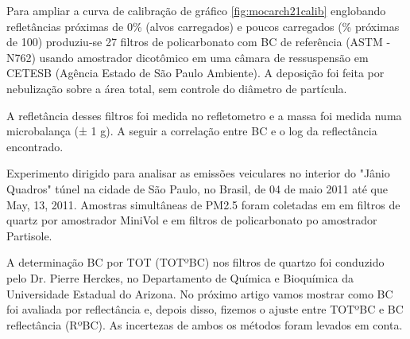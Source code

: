 Para ampliar a curva de calibração de gráfico \ref{fig:mocarch21calib} 
englobando refletâncias próximas de 0\% (alvos carregados) e poucos carregados
(\% próximas de 100) produziu-se 27 filtros de policarbonato com
BC de referência (ASTM -N762) usando amostrador dicotômico em uma câmara de 
ressuspensão em CETESB (Agência Estado de São Paulo Ambiente). 
A deposição foi feita por nebulização sobre a área total, 
sem controle do diâmetro de partícula.

A refletância desses filtros foi medida no refletometro e a massa foi medida 
numa microbalança (± 1 g).
A seguir a correlação entre BC e o log da reflectância encontrado.

%      

Experimento dirigido para analisar as emissões veiculares no interior do 
"Jânio Quadros" túnel na cidade de São Paulo, no Brasil, de 04 de maio 2011 
até que May, 13, 2011. Amostras simultâneas de PM2.5 foram coletadas em 
em filtros de quartz por amostrador MiniVol e em filtros de policarbonato 
po amostrador Partisole. 


A determinação BC por TOT (TOTºBC) nos filtros de quartzo foi conduzido pelo Dr. Pierre Herckes, no Departamento de Química e Bioquímica da Universidade Estadual do Arizona. No próximo artigo vamos mostrar como BC foi avaliada por reflectância e, depois disso, fizemos o ajuste entre TOTºBC e BC reflectância (RºBC). As incertezas de ambos os métodos foram levados em conta.




